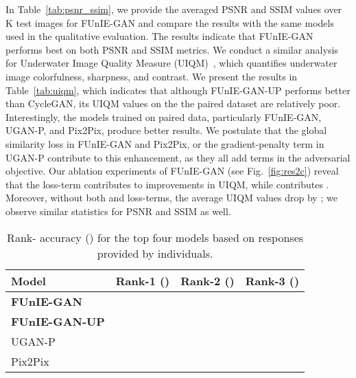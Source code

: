 \documentclass[10pt,twocolumn,letterpaper]{article}
\begin{document}
In Table~\ref{tab:psnr_ssim}, we provide the averaged PSNR and SSIM values over K test images for FUnIE-GAN and compare the results with the same models used in the qualitative evaluation. The results indicate that FUnIE-GAN performs best on both PSNR and SSIM metrics. 
We conduct a similar analysis for Underwater Image Quality Measure (UIQM)~\cite{panetta2016human,liu2019real}, which quantifies underwater image colorfulness, sharpness, and contrast. 
We present the results in Table~\ref{tab:uiqm}, which indicates that although FUnIE-GAN-UP performs better than CycleGAN, its UIQM values on the the paired dataset are relatively poor. Interestingly, the models trained on paired data, particularly FUnIE-GAN, UGAN-P, and Pix2Pix, produce better results. We postulate that the global similarity loss in FUnIE-GAN and Pix2Pix, or the gradient-penalty term in UGAN-P contribute to this enhancement, as they all add  terms in the adversarial objective. Our ablation experiments of FUnIE-GAN (see Fig.~\ref{fig:res2c}) reveal that the  loss-term contributes to  improvements in UIQM, while  contributes . Moreover, without both  and  loss-terms, the average UIQM values drop by ; we observe similar statistics for PSNR and SSIM as well.                 














\begin{table}[b]
\centering
\vspace{-2mm}
\caption{Rank- accuracy () for the top four models based on  responses provided by  individuals.}
\scriptsize
\begin{tabular}{l||c|c|c}
  \hline
  \textbf{Model} & Rank-1 () & Rank-2 () & Rank-3 () \\ \hline \textbf{FUnIE-GAN} &   &    &   \\ \textbf{FUnIE-GAN-UP} &   &    &   \\ UGAN-P &  &   &   \\ Pix2Pix &  &   &   \\ \hline
\end{tabular}
\label{tab:study}
\end{table}
\end{document}
